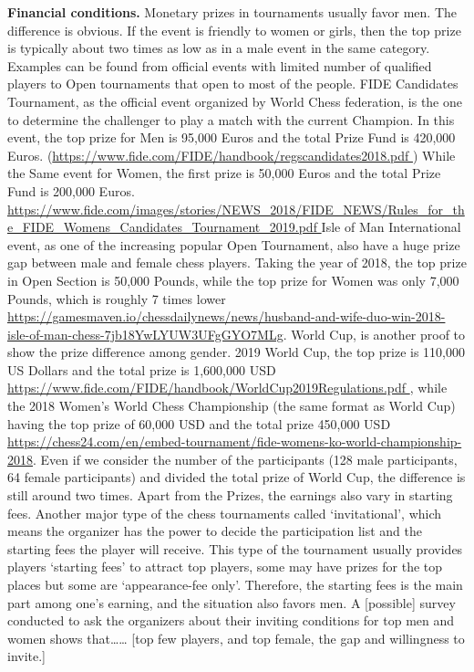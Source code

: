 {\bf Financial conditions.} 
Monetary prizes in tournaments usually favor men. The difference is obvious. If the event is friendly to women or girls, then the top prize is typically about two times as low as in a male event in the same category. Examples can be found from official events with limited number of qualified players to Open tournaments that open to most of the people. FIDE Candidates Tournament, as the official event organized by World Chess federation, is the one to determine the challenger to play a match with the current Champion. In this event, the top prize for Men is 95,000 Euros and the total Prize Fund is 420,000 Euros. (\url{https://www.fide.com/FIDE/handbook/regscandidates2018.pdf }) While the Same event for Women, the first prize is 50,000 Euros and the total Prize Fund is 200,000 Euros. \url{https://www.fide.com/images/stories/NEWS_2018/FIDE_NEWS/Rules_for_the_FIDE_Womens_Candidates_Tournament_2019.pdf } Isle of Man International event, as one of the increasing popular Open Tournament, also have a huge prize gap between male and female chess players. Taking the year of 2018, the top prize in Open Section is 50,000 Pounds, while the top prize for Women was only 7,000 Pounds, which is roughly 7 times lower \url{https://gamesmaven.io/chessdailynews/news/husband-and-wife-duo-win-2018-isle-of-man-chess-7jb18YwLYUW3UFgGYO7MLg}. World Cup, is another proof to show the prize difference among gender. 2019 World Cup, the top prize is 110,000 US Dollars and the total prize is 1,600,000 USD \url{https://www.fide.com/FIDE/handbook/WorldCup2019Regulations.pdf
}, while the 2018 Women’s World Chess Championship (the same format as World Cup) having the top prize of 60,000 USD and the total prize 450,000 USD \url{https://chess24.com/en/embed-tournament/fide-womens-ko-world-championship-2018}. Even if we consider the number of the participants (128 male participants, 64 female participants) and divided the total prize of World Cup, the difference is still around two times. 
Apart from the Prizes, the earnings also vary in starting fees. Another major type of the chess tournaments called ‘invitational’, which means the organizer has the power to decide the participation list and the starting fees the player will receive. This type of the tournament usually provides players ‘starting fees’ to attract top players, some may have prizes for the top places but some are ‘appearance-fee only’. Therefore, the starting fees is the main part among one’s earning, and the situation also favors men. A [possible] survey conducted to ask the organizers about their inviting conditions for top men and women shows that…… [top few players, and top female, the gap and willingness to invite.]


